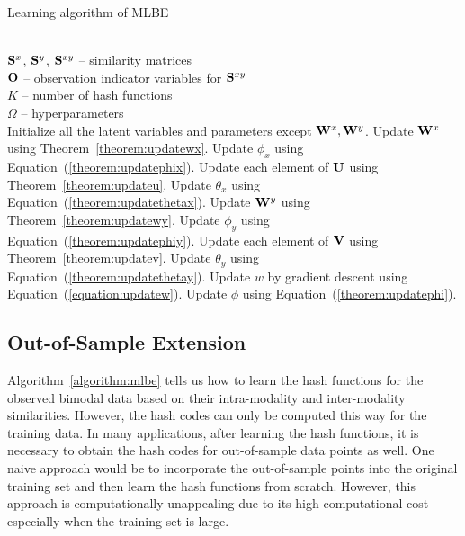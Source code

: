 \begin{algorithm}[ht]
\caption{Learning algorithm of \mbox{MLBE}}
\label{algorithm:mlbe}
\begin{algorithmic}
 \\
$\S^{x}$, $\S^{y}$, $\S^{xy}$ -- similarity matrices
\\ $\O$ -- observation indicator variables for $\S^{xy}$
\\ $K$ -- number of hash functions
\\ $\Omega$ --  hyperparameters
 \\
   \STATE  Initialize all the latent variables and parameters except $ \W^{x},\W^{y} $.
   \STATE Update $ \W^{x} $ using Theorem~\ref{theorem:updatewx}.
   \STATE Update $\phi_x$ using Equation~(\ref{theorem:updatephix}).
   \STATE Update each element of $ \U  $ using Theorem~\ref{theorem:updateu}.
   \STATE Update $\theta_x$ using Equation~(\ref{theorem:updatethetax}).
   \STATE Update $ \W^y $ using Theorem~\ref{theorem:updatewy}.
   \STATE Update $\phi_y$ using Equation~(\ref{theorem:updatephiy}).
   \STATE Update each element of $ \V $ using Theorem~\ref{theorem:updatev}.
   \STATE Update $\theta_y$ using Equation~(\ref{theorem:updatethetay}).
   \STATE Update $w$ by gradient descent using Equation~(\ref{equation:updatew}).
   \STATE Update $\phi$ using Equation~(\ref{theorem:updatephi}).
	\ENDWHILE

\end{algorithmic}
\end{algorithm}
\vspace{-0.2cm}
\subsection{Out-of-Sample Extension}

Algorithm~\ref{algorithm:mlbe} tells us how to learn the hash functions for the observed bimodal data based on their intra-modality and inter-modality similarities.  However, the hash codes can only be computed this way for the training data. In many applications, after learning the hash functions, it is necessary to obtain the hash codes for out-of-sample data points as well.  One naive approach would be to incorporate the out-of-sample points into the original training set and then learn the hash functions from scratch.  However, this approach is computationally unappealing due to its high computational cost especially when the training set is large.

